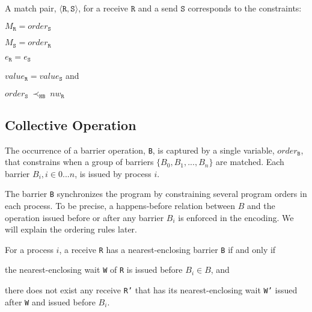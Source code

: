 \begin{definition} \label{def:match}
A match pair, $\langle\mathtt{R}, \mathtt{S}\rangle$, for a receive
$\mathtt{R}$ and a send $\mathtt{S}$ corresponds to the constraints:
\begin{compactenum}
\item $M_{\mathtt{R}} = \mathit{order}_{\mathtt{S}}$
\item $M_{\mathtt{S}} = \mathit{order}_{\mathtt{R}}$
\item $e_{\mathtt{R}} = e_{\mathtt{S}}$
\item $\mathit{value}_{\mathtt{R}} = \mathit{value}_{\mathtt{S}}$ and
\item $\mathit{order}_{\mathtt{S}}\ \mathrm{\prec_\mathtt{HB}}\ \mathit{nw}_{\mathtt{R}}$
\end{compactenum}
\end{definition}

\subsection{Collective Operation}

\begin{definition}[Barrier]\label{def:barrier}
The occurrence of a barrier operation, \texttt{B}, is captured by a
single variable, $\mathit{order}_\mathtt{B}$, that constrains when a group of barriers $\{B_0, B_1, ..., B_n\}$ are matched.  
Each barrier $B_i, i\in{0 ... n}$, is issued by process $i$. 
\end{definition}


The barrier \texttt{B} synchronizes the program by constraining several program orders in each process. To be precise, a happens-before relation between $B$ and the operation issued before or after any barrier $B_i$ is enforced in the encoding. We will explain the ordering rules later.

\begin{definition}\label{def:nb}
For a process $i$, a receive \texttt{R} has a nearest-enclosing barrier \texttt{B} if and only if
\begin{compactenum}
\item the nearest-enclosing wait \texttt{W} of \texttt{R} is issued before $B_i\in B$, and
\item there does not exist any receive \texttt{R'} that has its nearest-enclosing wait \texttt{W'} issued after \texttt{W} and issued before $B_i$.
\end{compactenum}
\end{definition}


